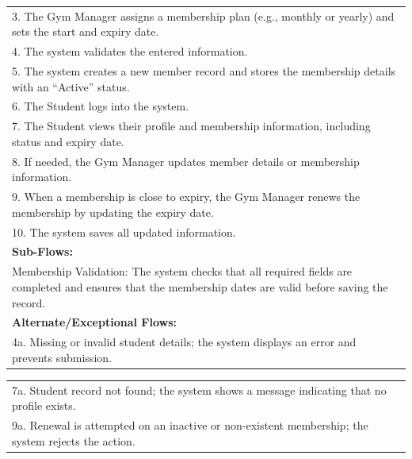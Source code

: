 \documentclass[12pt, a4paper]{article}
\begin{document}
\begin{table}[H]
\begin{tabularx}{\textwidth}{X}
        3. The Gym Manager assigns a membership plan (e.g., monthly or yearly) and sets the start and expiry date. \\
        4. The system validates the entered information. \\
        5. The system creates a new member record and stores the membership details with an “Active” status. \\
        6. The Student logs into the system. \\
        7. The Student views their profile and membership information, including status and expiry date. \\
        8. If needed, the Gym Manager updates member details or membership information. \\
        9. When a membership is close to expiry, the Gym Manager renews the membership by updating the expiry date. \\
        10. The system saves all updated information. \\
        \textbf{Sub-Flows:} \\
        Membership Validation: The system checks that all required fields are completed and ensures that the membership dates are valid before saving the record. \\
        \textbf{Alternate/Exceptional Flows:} \\
        4a. Missing or invalid student details; the system displays an error and prevents submission. \\
        \hline
    \end{tabularx}
\end{table}

\newpage

\begin{table}[H]
    \centering
    \renewcommand{\arraystretch}{1.3}
    \begin{tabularx}{\textwidth}{X}
        \hline
        7a. Student record not found; the system shows a message indicating that no profile exists. \\
        9a. Renewal is attempted on an inactive or non-existent membership; the system rejects the action. \\
        \hline
    \end{tabularx}
\end{table}
\end{document}
